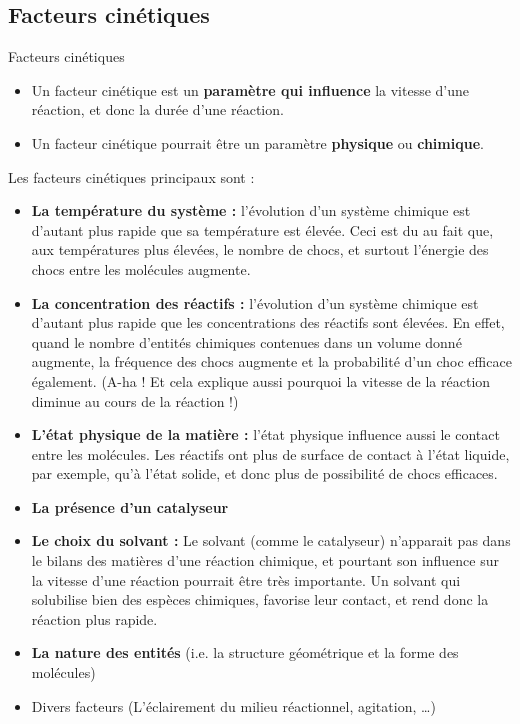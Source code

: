 \documentclass[11pt,a4paper]{article}
\begin{document}
\subsection{Facteurs cinétiques}

\begin{defn}{Facteurs cinétiques}
\begin{itemize}
    \item Un facteur cinétique est un \textbf{paramètre qui influence} la vitesse d’une réaction, et donc la durée d’une réaction.
    \item Un facteur cinétique pourrait être un paramètre \textbf{physique} ou \textbf{chimique}.
\end{itemize}
\end{defn}
	
Les facteurs cinétiques principaux sont :
\begin{itemize}
        \item \textbf{La température du système : }l’évolution d’un système chimique est d’autant plus rapide que sa température est élevée. Ceci est du au fait que, aux températures plus élevées, le nombre de chocs, et surtout l'énergie des chocs entre les molécules augmente.
        \item \textbf{La concentration des réactifs : }l’évolution d’un système chimique est d’autant plus rapide que les concentrations des réactifs sont élevées. En effet, quand le nombre d’entités chimiques contenues dans un volume donné augmente, la fréquence des chocs augmente et la probabilité d’un choc efficace également.  (A-ha ! Et cela explique aussi pourquoi la vitesse de la réaction diminue au cours de la réaction !)
        \item \textbf{L’état physique de la matière :} l’état physique influence aussi le contact entre les molécules. Les réactifs ont plus de surface de contact à l’état liquide, par exemple, qu’à l’état solide, et donc plus de possibilité de chocs efficaces.
        \item \textbf{La présence d’un catalyseur }
        \item \textbf{Le choix du solvant : }Le solvant (comme le catalyseur) n’apparait pas dans le bilans des matières d’une réaction chimique, et pourtant son influence sur la vitesse d’une réaction pourrait être très importante. Un solvant qui solubilise bien des espèces chimiques, favorise leur contact, et rend donc la réaction plus rapide. 
        \item \textbf{La nature des entités }(i.e. la structure géométrique et la forme des molécules) 
        \item Divers facteurs (L’éclairement du milieu réactionnel, agitation, …)
    \end{itemize}
\end{document}

